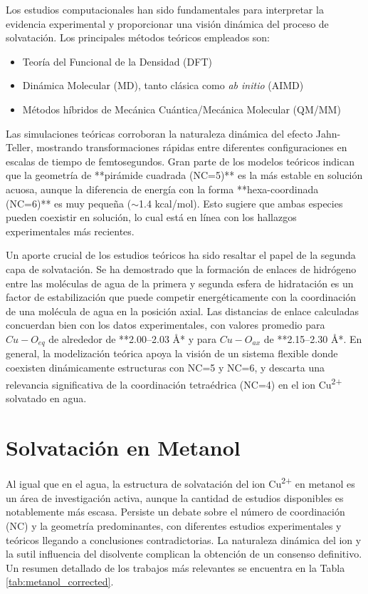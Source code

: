 Los estudios computacionales han sido fundamentales para interpretar la evidencia experimental y proporcionar una visión dinámica del proceso de solvatación. Los principales métodos teóricos empleados son:
\begin{itemize}
    \item Teoría del Funcional de la Densidad (DFT)
    \item Dinámica Molecular (MD), tanto clásica como \textit{ab initio} (AIMD)
    \item Métodos híbridos de Mecánica Cuántica/Mecánica Molecular (QM/MM)
\end{itemize}

Las simulaciones teóricas corroboran la naturaleza dinámica del efecto Jahn-Teller, mostrando transformaciones rápidas entre diferentes configuraciones en escalas de tiempo de femtosegundos. Gran parte de los modelos teóricos indican que la geometría de **pirámide cuadrada (NC=5)** es la más estable en solución acuosa, aunque la diferencia de energía con la forma **hexa-coordinada (NC=6)** es muy pequeña ($\sim$1.4 kcal/mol). Esto sugiere que ambas especies pueden coexistir en solución, lo cual está en línea con los hallazgos experimentales más recientes.

Un aporte crucial de los estudios teóricos ha sido resaltar el papel de la segunda capa de solvatación. Se ha demostrado que la formación de enlaces de hidrógeno entre las moléculas de agua de la primera y segunda esfera de hidratación es un factor de estabilización que puede competir energéticamente con la coordinación de una molécula de agua en la posición axial. Las distancias de enlace calculadas concuerdan bien con los datos experimentales, con valores promedio para $Cu-O_{eq}$ de alrededor de **2.00--2.03 \AA** y para $Cu-O_{ax}$ de **2.15--2.30 \AA**. En general, la modelización teórica apoya la visión de un sistema flexible donde coexisten dinámicamente estructuras con NC=5 y NC=6, y descarta una relevancia significativa de la coordinación tetraédrica (NC=4) en el ion Cu\textsuperscript{2+} solvatado en agua.

\section{Solvatación  en Metanol}


Al igual que en el agua, la estructura de solvatación del ion Cu\textsuperscript{2+} en metanol es un área de investigación activa, aunque la cantidad de estudios disponibles es notablemente más escasa. Persiste un debate sobre el número de coordinación (NC) y la geometría predominantes, con diferentes estudios experimentales y teóricos llegando a conclusiones contradictorias. La naturaleza dinámica del ion y la sutil influencia del disolvente complican la obtención de un consenso definitivo. Un resumen detallado de los trabajos más relevantes se encuentra en la Tabla \ref{tab:metanol_corrected}.

